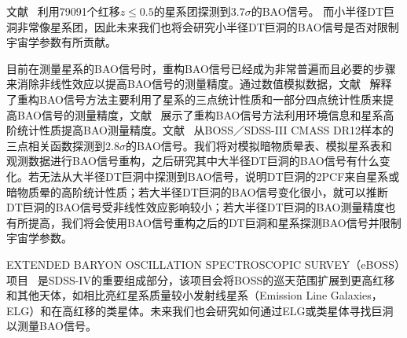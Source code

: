 文献~ 利用79091个红移$z \leq 0.5$的星系团探测到$3.7 \sigma$的BAO信号。 而小半径DT巨洞非常像星系团，因此未来我们也将会研究小半径DT巨洞的BAO信号是否对限制宇宙学参数有所贡献。

目前在测量星系的BAO信号时，重构BAO信号已经成为非常普遍而且必要的步骤来消除非线性效应以提高BAO信号的测量精度。通过数值模拟数据，文献~ 解释了重构BAO信号方法主要利用了星系的三点统计性质和一部分四点统计性质来提高BAO信号的测量精度，文献~ 展示了重构BAO信号方法利用环境信息和星系高阶统计性质提高BAO测量精度。文献~ 从BOSS／SDSS-III CMASS DR12样本的三点相关函数探测到$2.8\sigma$的BAO信号。我们将对模拟暗物质晕表、模拟星系表和观测数据进行BAO信号重构，之后研究其中大半径DT巨洞的BAO信号有什么变化。若无法从大半径DT巨洞中探测到BAO信号，说明DT巨洞的2PCF来自星系或暗物质晕的高阶统计性质；若大半径DT巨洞的BAO信号变化很小，就可以推断DT巨洞的BAO信号受非线性效应影响较小；若大半径DT巨洞的BAO测量精度也有所提高，我们将会使用BAO信号重构之后的DT巨洞和星系探测BAO信号并限制宇宙学参数。

EXTENDED BARYON OSCILLATION SPECTROSCOPIC SURVEY（eBOSS）项目~\cite{Dawson2016} 是SDSS-IV的重要组成部分，该项目会将BOSS的巡天范围扩展到更高红移和其他天体，如相比亮红星系质量较小发射线星系（Emission Line Galaxies，ELG）和在高红移的类星体。未来我们也会研究如何通过ELG或类星体寻找巨洞以测量BAO信号。

